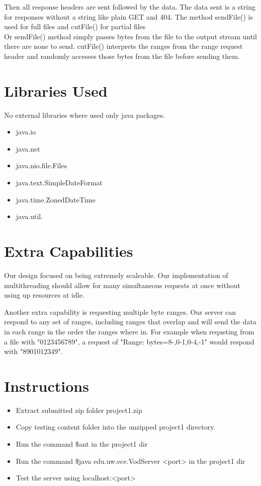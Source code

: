 \documentclass[11pt, letterpaper]{report}
\begin{document}
Then all response headers are sent followed by the data. The data sent is a string for responses without a string like plain GET and 404. The method sendFile() is used for full files and cutFile() for partial files \\

Or sendFile() method simply passes bytes from the file to the output stream until there are none to send. cutFile() interprets the ranges from the range request header and randomly accesses those bytes from the file before sending them.
\section{Libraries Used}
No external libraries where used only java packages.
\begin{itemize}
    \item java.io
    \item java.net
    \item java.nio.file.Files
    \item java.text.SimpleDateFormat
    \item java.time.ZonedDateTime
    \item java.util.
\end{itemize}

\section{Extra Capabilities}
Our design focused on being extremely scaleable. Our implementation of multithreading should allow for many simultaneous requests at once without using up resources at idle.

Another extra capability is requesting multiple byte ranges. Our server can respond to any set of ranges, including ranges that overlap and will send the data in each range in the order the ranges where in. For example when requsting from a file with "0123456789", a request of "Range: bytes=8-,0-1,0-4,-1" would respond with "8901012349".

\section{Instructions}
\begin{itemize}
    \item Extract submitted zip folder project1.zip

    \item Copy testing content folder into the unzipped project1 directory.
    
    \item Run the command \$ant in the project1 dir
    
    \item Run the command \$java edu.uw.ece.VodServer <port> in the project1 dir
    
    \item Test the server using localhost:<port>
    
\end{itemize}
\end{document}
